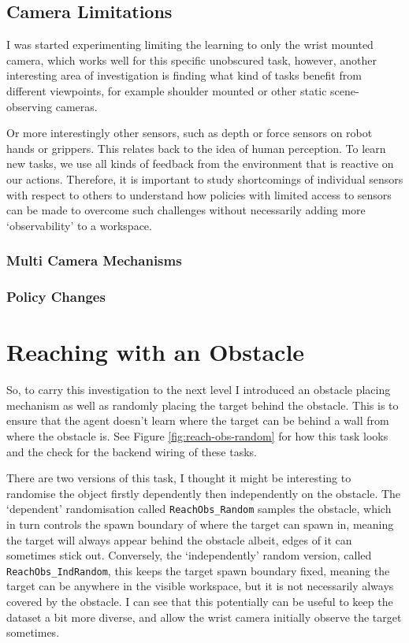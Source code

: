 \subsection{Camera Limitations}

I was started experimenting limiting the learning to only the wrist mounted camera, which works well for this specific unobscured task, however, another interesting area of investigation is finding what kind of tasks benefit from different viewpoints, for example shoulder mounted or other static scene-observing cameras. 

Or more interestingly other sensors, such as depth or force sensors on robot hands or grippers. This relates back to the idea of human perception. To learn new tasks, we use all kinds of feedback from the environment that is reactive on our actions. Therefore, it is important to study shortcomings of individual sensors with respect to others to understand how policies with limited access to sensors can be made to overcome such challenges without necessarily adding more `observability' to a workspace.

\subsubsection{Multi Camera Mechanisms}
\subsubsection{Policy Changes}


\section{Reaching with an Obstacle}
So, to carry this investigation to the next level I introduced an obstacle placing mechanism as well as randomly placing the target behind the obstacle. This is to ensure that the agent doesn't learn where the target can be behind a wall from where the obstacle is. See Figure \ref{fig:reach-obs-random} for how this task looks and the check  for the backend wiring of these tasks.

There are two versions of this task, I thought it might be interesting to randomise the object firstly dependently then independently on the obstacle. The `dependent' randomisation called \verb|ReachObs_Random| samples the obstacle, which in turn controls the spawn boundary of where the target can spawn in, meaning the target will always appear behind the obstacle albeit, edges of it can sometimes stick out. Conversely, the `independently' random version, called \verb|ReachObs_IndRandom|, this keeps the target spawn boundary fixed, meaning the target can be anywhere in the visible workspace, but it is not necessarily always covered by the obstacle. I can see that this potentially can be useful to keep the dataset a bit more diverse, and allow the wrist camera initially observe the target sometimes.

